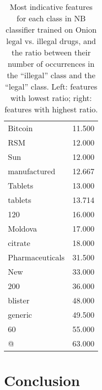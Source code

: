 \documentclass[11pt,a4paper,table]{article}
\begin{document}
\begin{table}
\begin{tabular}{lr}
Bitcoin & 11.500\\
RSM & 12.000\\
Sun & 12.000\\
manufactured & 12.667\\
Tablets & 13.000\\
tablets & 13.714\\
120 & 16.000\\
Moldova & 17.000\\
citrate & 18.000\\
Pharmaceuticals & 31.500\\
New & 33.000\\
200 & 36.000\\
blister & 48.000\\
generic & 49.500\\
60 & 55.000\\
@ & 63.000\\
\end{tabular}
\caption{Most indicative features for each class in NB classifier
trained on Onion legal vs. illegal drugs,
and the ratio between their number of occurrences in the ``illegal''
class and the ``legal'' class.
Left: features with lowest ratio; right: features with highest ratio.
\label{tab:nb_weights}}
\end{table}

\section{Conclusion}
 














\end{document}
